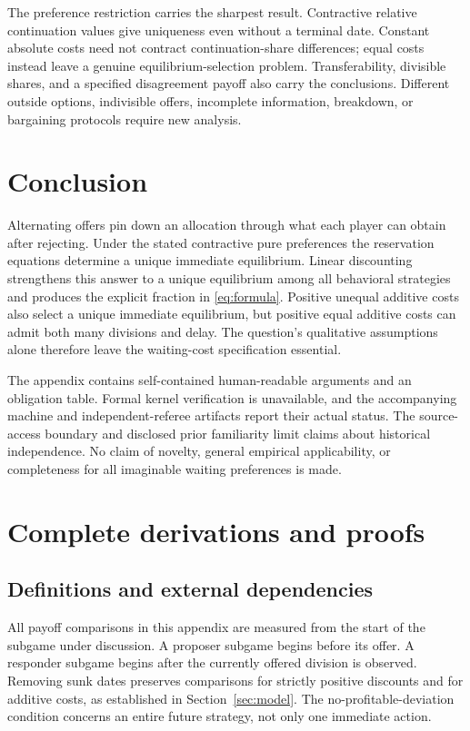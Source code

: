 \documentclass[11pt]{article}
\begin{document}
The preference restriction carries the sharpest result. Contractive relative continuation values give uniqueness even without a terminal date. Constant absolute costs need not contract continuation-share differences; equal costs instead leave a genuine equilibrium-selection problem. Transferability, divisible shares, and a specified disagreement payoff also carry the conclusions. Different outside options, indivisible offers, incomplete information, breakdown, or bargaining protocols require new analysis.

\section{Conclusion}
Alternating offers pin down an allocation through what each player can obtain after rejecting. Under the stated contractive pure preferences the reservation equations determine a unique immediate equilibrium. Linear discounting strengthens this answer to a unique equilibrium among all behavioral strategies and produces the explicit fraction in \eqref{eq:formula}. Positive unequal additive costs also select a unique immediate equilibrium, but positive equal additive costs can admit both many divisions and delay. The question's qualitative assumptions alone therefore leave the waiting-cost specification essential.

The appendix contains self-contained human-readable arguments and an obligation table. Formal kernel verification is unavailable, and the accompanying machine and independent-referee artifacts report their actual status. The source-access boundary and disclosed prior familiarity limit claims about historical independence. No claim of novelty, general empirical applicability, or completeness for all imaginable waiting preferences is made.

\appendix
\section{Complete derivations and proofs}\label{app:proofs}
\subsection{Definitions and external dependencies}
All payoff comparisons in this appendix are measured from the start of the subgame under discussion. A proposer subgame begins before its offer. A responder subgame begins after the currently offered division is observed. Removing sunk dates preserves comparisons for strictly positive discounts and for additive costs, as established in Section~\ref{sec:model}. The no-profitable-deviation condition concerns an entire future strategy, not only one immediate action.
\end{document}
